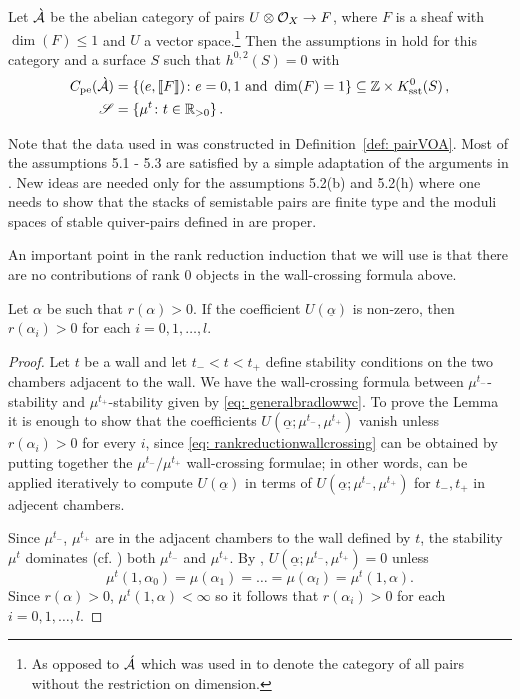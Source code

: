 \documentclass[a4paper, 12pt]{amsart}
\begin{document}
\begin{assumption}
\label{ass:WCpair}
Let $\grave{{\mathcal A}}$ be the abelian category of pairs $U\otimes {\mathcal O}_X\to F$, where $F$ is a sheaf with $\dim(F)\leq 1$ and $U$ a vector space.\footnote{As opposed to $\acute{{\mathcal A}}$ which was used in \cite{Jo21} to denote the category of all pairs without the restriction on dimension.} 
Then the assumptions in \cite[Assumption 5.1-5.3]{Jo21} hold for this category and a surface $S$ such that $h^{0,2}(S)=0$ with
\begin{align*}
C_{\textup{pe}}(\grave{{\mathcal A}})&=\{(e,\llbracket F\rrbracket)\colon e=0,1\textup{ and }\dim(F)= 1\}\subseteq {\mathbb{Z}}\times K_{\text{sst}}^0(S)\,,\\
\mathscr{S}&=\{\mu^t\colon t\in {\mathbb{R}}_{>0}\}\,.
\end{align*}
\end{assumption}
\begin{remark}Note that the data used in \cite[Assumption 4.4]{Jo21} was constructed in Definition~\ref{def: pairVOA}. Most of the assumptions 5.1 - 5.3 are satisfied by a simple adaptation of the arguments in \cite[Sections 8.2 and 8.3]{Jo21}. New ideas are needed only for the assumptions 5.2(b) and 5.2(h)  where one needs to show that the stacks of semistable pairs are finite type and the moduli spaces of stable quiver-pairs defined in \cite[Def. 5.5]{Jo21} are proper.\end{remark}

An important point in the rank reduction induction that we will use is that there are no contributions of rank 0 objects in the wall-crossing formula above.

\begin{lemma}\label{lem: norank0}
Let $\alpha$ be such that $r(\alpha)>0$. If the coefficient $U(\underline{\alpha})$ is non-zero, then $r(\alpha_i)>0$ for each $i=0, 1, \ldots, l$. 
\end{lemma}
\begin{proof}
Let $t$ be a wall and let $t_-<t<t_+$ define stability conditions on the two chambers adjacent to the wall. We have the wall-crossing formula between $\mu^{t_-}$-stability and $\mu^{t_+}$-stability given by \eqref{eq: generalbradlowwc}. To prove the Lemma it is enough to show that the coefficients $U(\underline{\alpha}; \mu^{t_-}, \mu^{t_+})$ vanish unless $r(\alpha_i)> 0$ for every $i$, since \eqref{eq: rankreductionwallcrossing} can be obtained by putting together the $\mu^{t_-}/\mu^{t_+}$ wall-crossing formulae; in other words, \cite[Theorem 3.11]{Jo21} can be applied iteratively to compute $U(\underline{\alpha})$ in terms of $U(\underline{\alpha}; \mu^{t_-}, \mu^{t_+})$ for $t_-, t_+$ in adjecent chambers. 

Since $\mu^{t_-}$, $\mu^{t_+}$ are in the adjacent chambers to the wall defined by $t$, the stability $\mu^t$ dominates (cf. \cite[Definition 3.8]{Jo21}) both $\mu^{t_-}$ and $\mu^{t_+}$. By \cite[Theorem 3.11]{Jo21}, $U(\underline{\alpha}; \mu^{t_-}, \mu^{t_+})=0$ unless
\[\mu^t(1, \alpha_0)=\mu(\alpha_1)=\ldots=\mu(\alpha_l)=\mu^t(1, \alpha).\]
Since $r(\alpha)>0$, $\mu^t(1, \alpha)<\infty$ so it follows that $r(\alpha_i)>0$ for each $i=0, 1, \ldots, l$. \qedhere
\end{proof}
\end{document}
